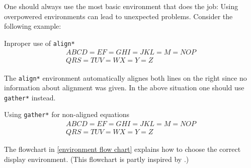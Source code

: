 One should always use the most basic environment that does the job:
Using overpowered environments can lead to unexpected problems.
Consider the following example:
\begin{showlatex}{Inproper use of \texttt{align*}}
\begin{align*}
  ABCD = EF = GHI = JKL = M = NOP
  \\
  QRS = TUV = WX = Y = Z
\end{align*}
\end{showlatex}
The \texttt{align*} environment automatically alignes both lines on the right since no information about alignment was given.
In the above situation one should use \texttt{gather*} instead.
\begin{showlatex}{Using \texttt{gather*} for non-aligned equations}
\begin{gather*}
  ABCD = EF = GHI = JKL = M = NOP
  \\
  QRS = TUV = WX = Y = Z
\end{gather*}
\end{showlatex}
The flowchart in \cref{environment flow chart} explains how to choose the correct display environment.
(This flowchart is partly inspired by \cite{flowchart}.)

